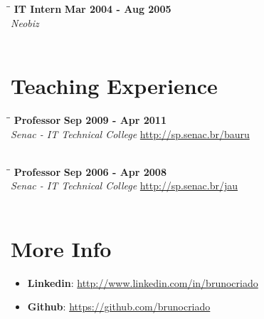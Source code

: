 \documentclass[margin]{res}
\begin{document}
\begin{resume}
\vspace{-0.1in}
\begin{tabbing}
  \hspace{2.3in}\= \hspace{1.7in}\= \kill %
  \textbf{IT Intern}    \>\>\textbf{Mar 2004 - Aug 2005}\\
  \textit{Neobiz} \\\\
\end{tabbing}\vspace{-20pt}      %


\section{Teaching Experience}

\vspace{-0.1in}
\begin{tabbing}
  \hspace{2.3in}\= \hspace{1.7in}\= \kill %
  \textbf{Professor}    \>\>\textbf{Sep 2009 - Apr 2011}\\
  \textit{Senac - IT Technical College} \url{http://sp.senac.br/bauru}\\\\
\end{tabbing}\vspace{-20pt}      %

\vspace{-0.1in}
\begin{tabbing}
  \hspace{2.3in}\= \hspace{1.7in}\= \kill %
  \textbf{Professor}    \>\>\textbf{Sep 2006 - Apr 2008}\\
  \textit{Senac - IT Technical College} \url{http://sp.senac.br/jau}\\\\
\end{tabbing}\vspace{-20pt}      %


\section{More Info}
\begin{itemize}
\item \textbf{Linkedin}: \url{http://www.linkedin.com/in/brunocriado}
\item \textbf{Github}: \url{https://github.com/brunocriado}
\end{itemize}

\end{resume}
\end{document}
